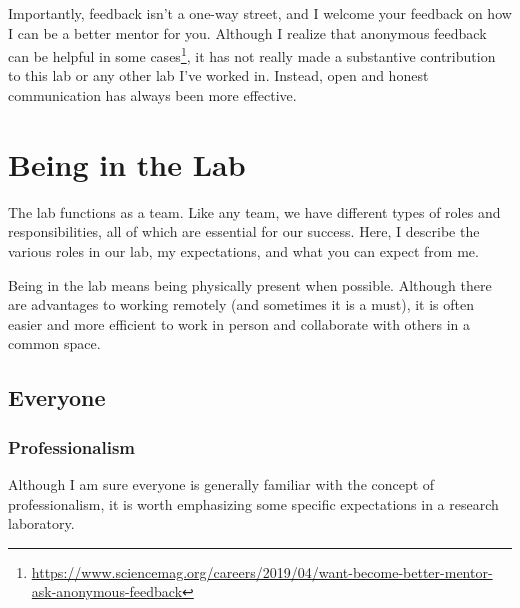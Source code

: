 \documentclass[letterpaper,11pt,oneside]{memoir}
\begin{document}
Importantly, feedback isn't a one-way street, and I welcome your feedback on how I can be a better mentor for you. Although I realize that anonymous feedback can be helpful in some cases\footnote{\url{https://www.sciencemag.org/careers/2019/04/want-become-better-mentor-ask-anonymous-feedback}}, it has not really made a substantive contribution to this lab or any other lab I've worked in. Instead, open and honest communication has always been more effective. 




\chapter{Being in the Lab}

The lab functions as a team. Like any team, we have different types of roles and responsibilities, all of which are essential for our success. Here, I describe the various roles in our lab, my expectations, and what you can expect from me. 

\begin{shaded}
\noindent Being in the lab means being physically present when possible. Although there are advantages to working remotely (and sometimes it is a must), it is often easier and more efficient to work in person and collaborate with others in a common space.
\end{shaded}


\section{Everyone}

\subsection{Professionalism}
Although I am sure everyone is generally familiar with the concept of professionalism, it is worth emphasizing some specific expectations in a research laboratory. 
\end{document}
